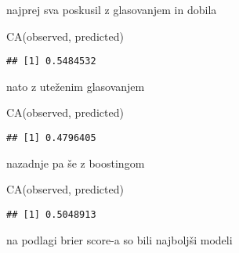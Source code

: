 \documentclass[
]{article}
\newenvironment{Shaded}{\begin{snugshade}}{\end{snugshade}}
\newcommand{\FunctionTok}[1]{\textcolor[rgb]{0.00,0.00,0.00}{#1}}
\newcommand{\NormalTok}[1]{#1}
\begin{document}
najprej sva poskusil z glasovanjem in dobila

\begin{Shaded}
\begin{Highlighting}[]
\FunctionTok{CA}\NormalTok{(observed, predicted)}
\end{Highlighting}
\end{Shaded}

\begin{verbatim}
## [1] 0.5484532
\end{verbatim}

nato z uteženim glasovanjem

\begin{Shaded}
\begin{Highlighting}[]
\FunctionTok{CA}\NormalTok{(observed, predicted)}
\end{Highlighting}
\end{Shaded}

\begin{verbatim}
## [1] 0.4796405
\end{verbatim}

nazadnje pa še z boostingom

\begin{Shaded}
\begin{Highlighting}[]
\FunctionTok{CA}\NormalTok{(observed, predicted)}
\end{Highlighting}
\end{Shaded}

\begin{verbatim}
## [1] 0.5048913
\end{verbatim}

na podlagi brier score-a so bili najboljši modeli
\end{document}
